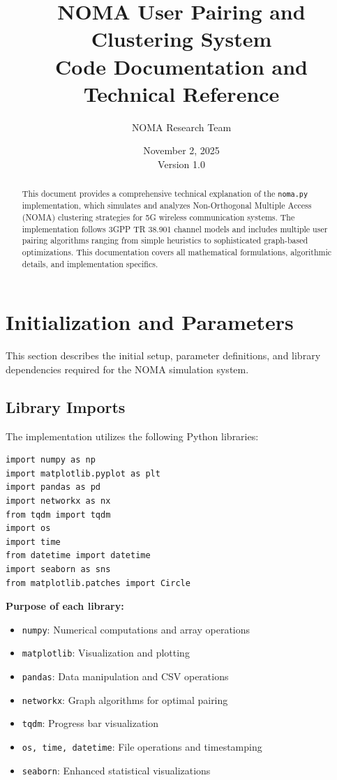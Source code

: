 \documentclass[12pt,a4paper]{article}
\title{
    \textbf{NOMA User Pairing and Clustering System}\\
    \Large{Code Documentation and Technical Reference}
}
\author{NOMA Research Team}
\date{November 2, 2025\\Version 1.0}
\newcommand{\code}[1]{\texttt{#1}}
\begin{document}
\maketitle
\thispagestyle{empty}

\begin{abstract}
This document provides a comprehensive technical explanation of the \code{noma.py} implementation, which simulates and analyzes Non-Orthogonal Multiple Access (NOMA) clustering strategies for 5G wireless communication systems. The implementation follows 3GPP TR 38.901 channel models and includes multiple user pairing algorithms ranging from simple heuristics to sophisticated graph-based optimizations. This documentation covers all mathematical formulations, algorithmic details, and implementation specifics.
\end{abstract}

\newpage
\tableofcontents
\newpage

\section{Initialization and Parameters}

This section describes the initial setup, parameter definitions, and library dependencies required for the NOMA simulation system.

\subsection{Library Imports}

The implementation utilizes the following Python libraries:

\begin{lstlisting}[caption={Required Library Imports}]
import numpy as np
import matplotlib.pyplot as plt
import pandas as pd
import networkx as nx
from tqdm import tqdm
import os
import time
from datetime import datetime
import seaborn as sns
from matplotlib.patches import Circle
\end{lstlisting}

\textbf{Purpose of each library:}
\begin{itemize}
    \item \texttt{numpy}: Numerical computations and array operations
    \item \texttt{matplotlib}: Visualization and plotting
    \item \texttt{pandas}: Data manipulation and CSV operations
    \item \texttt{networkx}: Graph algorithms for optimal pairing
    \item \texttt{tqdm}: Progress bar visualization
    \item \texttt{os, time, datetime}: File operations and timestamping
    \item \texttt{seaborn}: Enhanced statistical visualizations
\end{itemize}
\end{document}

